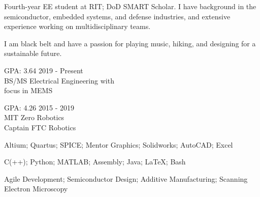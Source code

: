 \documentclass{cv}  %
\begin{document}
\begin{paracol}{2}


\bodyfont Fourth-year EE student at RIT; DoD SMART Scholar. I have background in the semiconductor, embedded systems, and defense industries, and extensive experience working on multidisciplinary teams.

I am black belt and have a passion for playing music, hiking, and designing for a sustainable future.

{\color{black}\Large{}}

{\color{black} GPA: 3.64} \hfill 2019 - Present \\
\bodyfont BS/MS Electrical Engineering with \\
focus in MEMS\\
\divider

{\color{black}\Large{}}

{\color{black} GPA: 4.26} \hfill 2015 - 2019 \\
MIT Zero Robotics \\
Captain FTC Robotics

\faLaptop \hspace{6pt} Altium; Quartus; SPICE; Mentor Graphics; Solidworks; AutoCAD; Excel \par
\faCode \hspace{6pt} C(++); Python; MATLAB; Assembly; Java; \LaTeX{}; Bash \par
\faWrench \hspace{6pt} Agile Development; Semiconductor Design; Additive Manufacturing; Scanning Electron Microscopy \par


\switchcolumn   %



\end{paracol}
\end{document}

